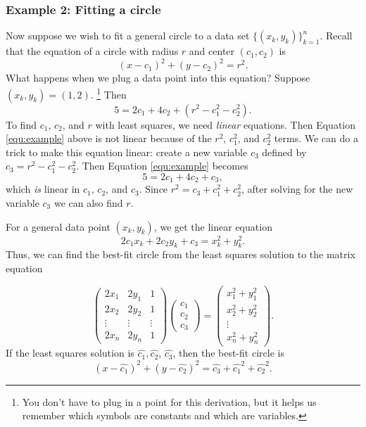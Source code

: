 \subsubsection*{Example 2: Fitting a circle}
Now suppose we wish to fit a general circle to a data set $\{(x_k, y_k)\}_{k=1}^n$. Recall that the equation of a circle with radius $r$ and center $(c_1,c_2)$ is
\begin{equation}
\label{circle}
(x-c_1)^2 + (y-c_2)^2 = r^2.
\end{equation}
What happens when we plug a data point into this equation? Suppose $(x_k, y_k)=(1,2)$.
\footnote{You don't have to plug in a point for this derivation, but it helps us remember which symbols are constants and which are variables.} Then
\begin{equation*}\label{equ:example}
5 = 2c_1+4c_2+(r^2-c_1^2-c_2^2).
\end{equation*}
To find $c_1$, $c_2$, and $r$ with least squares, we need \emph{linear} equations. 
Then Equation \ref{equ:example} above is not linear because of the $r^2$, $c_1^2$, and $c_2^2$ terms. 
We can do a trick to make this equation linear: create a new variable $c_3$ defined by $c_3 = r^2-c_1^2-c_2^2$. 
Then Equation \ref{equ:example} becomes
\[
5=2c_1+4c_2+c_3,
\]
which \emph{is} linear in $c_1$, $c_2$, and $c_3$. Since $r^2 = c_3+c_1^2+c_2^2$, after solving for the new variable $c_3$ we can also find $r$.

For a general data point $(x_k, y_k)$, we get the linear equation
\[
2c_1x_k+2c_2y_k+c_3=x_k^2+y_k^2.
\]
Thus, we can find the best-fit circle from the least squares solution to the matrix equation

\begin{equation}\label{equ:circle_fit}
\begin{pmatrix}
2 x_1 & 2 y_1 & 1\\
2 x_2 & 2 y_2 & 1\\
\vdots & \vdots & \vdots \\
2 x_n & 2 y_n & 1
\end{pmatrix}
\begin{pmatrix}
c_1\\
c_2\\
c_3
\end{pmatrix}=
\begin{pmatrix}
x_1^2 + y_1^2\\
x_2^2 + y_2^2\\
\vdots\\
x_n^2 + y_n^2
\end{pmatrix}.
\end{equation}
If the least squares solution is $\widehat{c_1}, \widehat{c_2}$, $\widehat{c_3}$, then the best-fit circle is
\[
(x-\widehat{c_1})^2 + (y-\widehat{c_2})^2 = \widehat{c_3}+\widehat{c_1}^2+\widehat{c_2}^2.
\]


